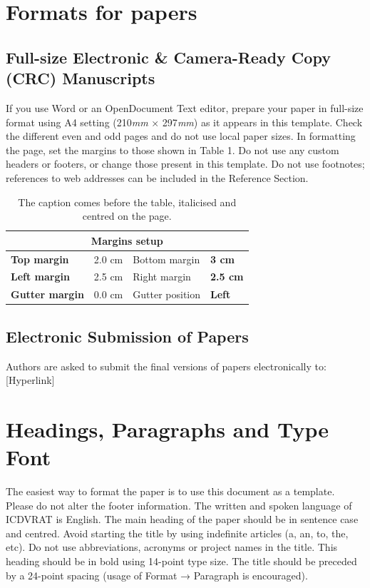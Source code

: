 \documentclass[A4,10pt,twoside]{article}
\begin{document}
\section{Formats for papers}

\subsection{Full-size Electronic \& Camera-Ready Copy (CRC) Manuscripts}	 
If you use Word or an OpenDocument Text editor, prepare your paper in full-size format using A4 setting (210\textit{mm} × 297\textit{mm}) as it appears in this template. Check the different even and odd pages and do not use local paper sizes. In formatting the page, set the margins to those shown in Table 1. Do not use any custom headers or footers, or change those present in this template. Do not use footnotes; references to web addresses can be included in the Reference Section.

\begin{table}[ht]
\caption{The caption comes before the table, italicised and centred on the page.}
\label{tab:Table_1}
\centering
\begin{tabular}{|llll|}
\hline
\multicolumn{4}{|c|}{\textbf{Margins setup}} \\ \hline
\multicolumn{1}{|l|}{\textbf{Top   margin}} & \multicolumn{1}{l|}{2.0   cm} & \multicolumn{1}{l|}{Bottom   margin} & \textbf{3   cm} \\ \hline
\multicolumn{1}{|l|}{\textbf{Left   margin}} & \multicolumn{1}{l|}{2.5   cm} & \multicolumn{1}{l|}{Right   margin} & \textbf{2.5   cm} \\ \hline
\multicolumn{1}{|l|}{\textbf{Gutter   margin}} & \multicolumn{1}{l|}{0.0   cm} & \multicolumn{1}{l|}{Gutter   position} & \textbf{Left} \\ \hline
\end{tabular}
\end{table}

\subsection{Electronic Submission of Papers}
Authors are asked to submit the final versions of papers electronically to: [Hyperlink] 

\section{Headings, Paragraphs and Type Font}
The easiest way to format the paper is to use this document as a template. Please do not alter the footer information. The written and spoken language of ICDVRAT is English. The main heading of the paper should be in sentence case and centred. Avoid starting the title by using indefinite articles (a, an, to, the, etc). Do not use abbreviations, acronyms or project names in the title. This heading should be in bold using 14-point type size. The title should be preceded by a 24-point spacing (usage of Format → Paragraph is encouraged).
\vspace{10pt}
\end{document}
